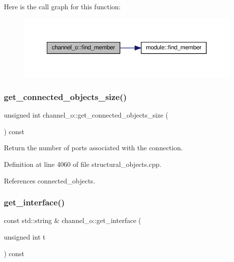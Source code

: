 Here is the call graph for this function\+:
\nopagebreak
\begin{figure}[H]
\begin{center}
\leavevmode
\includegraphics[width=349pt]{d3/d41/classchannel__o_ac5409b74292b8cf624419f3368cac730_cgraph}
\end{center}
\end{figure}
\mbox{\label{classchannel__o_aa217df8fc4774830d2ba126f88abcb5e}} 
\subsubsection{\texorpdfstring{get\+\_\+connected\+\_\+objects\+\_\+size()}{get\_connected\_objects\_size()}}
{\footnotesize\ttfamily unsigned int channel\+\_\+o\+::get\+\_\+connected\+\_\+objects\+\_\+size (\begin{DoxyParamCaption}{ }\end{DoxyParamCaption}) const}



Return the number of ports associated with the connection. 



Definition at line 4060 of file structural\+\_\+objects.\+cpp.



References connected\+\_\+objects.

\mbox{\label{classchannel__o_a1ce411d795342a195c0f13fa9adbae23}} 
\subsubsection{\texorpdfstring{get\+\_\+interface()}{get\_interface()}}
{\footnotesize\ttfamily const std\+::string \& channel\+\_\+o\+::get\+\_\+interface (\begin{DoxyParamCaption}\item[{unsigned int}]{t }\end{DoxyParamCaption}) const}




